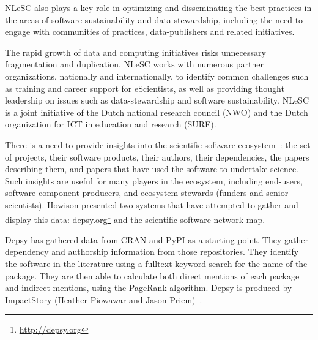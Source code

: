 \documentclass[a4paper,UKenglish]{dagrep}
\begin{document}
NLeSC also plays a key role in optimizing and disseminating the best
practices in the areas of software sustainability and
data-stewardship, including the need to engage with communities of
practices, data-publishers and related initiatives.

The rapid growth of data and computing initiatives risks unnecessary
fragmentation and duplication. NLeSC works with numerous partner
organizations, nationally and internationally, to identify common
challenges such as training and career support for eScientists, as
well as providing thought leadership on issues such as
data-stewardship and software sustainability. NLeSC is a joint
initiative of the Dutch national research council (NWO) and the Dutch
organization for ICT in education and research (SURF).





There is a need to provide insights into the scientific software ecosystem~\cite{bogart_mapping_2015}: the set of projects, their software products, their authors, their dependencies, the papers describing them, and papers that have used the software to undertake science.  Such insights are useful for many players in the ecosystem, including end-users, software component producers, and ecosystem stewards (funders and senior scientists). Howison presented two systems that have attempted to gather and display this data: depsy.org\footnote{\url{http://depsy.org}} and the scientific software network map.

Depsy has gathered data from CRAN and PyPI as a starting point. They gather dependency and authorship information from those repositories. They identify the software in the literature using a fulltext keyword search for the name of the package. They are then able to calculate both direct mentions of each package and indirect mentions, using the PageRank algorithm.  Depsy is produced by ImpactStory (Heather Piowawar and Jason Priem)~\cite{singh_chawla_unsung_2016}.
\end{document}
